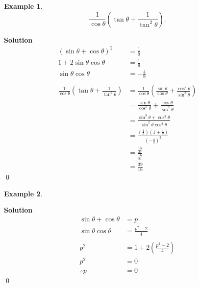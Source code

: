 \documentclass{article}
\newtheorem*{example*}{Example}
\newenvironment{solution}{\begin{trivlist}\item[]{\bf Solution}}{\qed \end{trivlist}}
\begin{document}
\newpage
\begin{example*}
    \[
    \frac{1}{\cos\theta}\left( \tan\theta + \frac{1}{\tan^2\theta} \right).
    \]
\end{example*}
\begin{solution}
    \begin{align*}
        (\sin\theta + \cos\theta)^2 &= \frac{1}{9} \\
        1 + 2\sin\theta\cos\theta &= \frac{1}{9} \\
        \sin\theta\cos\theta &= -\frac{4}{9}
        \\\\
        \frac{1}{\cos\theta}\left( \tan\theta + \frac{1}{\tan^2\theta} \right)
        &= \frac{1}{\cos\theta}\left( \frac{\sin\theta}{\cos\theta} + \frac{\cos^2\theta}{\sin^2\theta} \right) \\[0.5em]
        &= \frac{\sin\theta}{\cos^2\theta} + \frac{\cos\theta}{\sin^2\theta} \\[0.5em]
        &= \frac{\sin^3\theta + \cos^3\theta}{\sin^2\theta\cos^2\theta} \\[0.5em]
        &= \frac{\left( \frac{1}{3} \right)\left( 1 + \frac{4}{9} \right)}{\left( -\frac{4}{9} \right)^2} \\[0.5em]
        &= \frac{\frac{13}{27}}{\frac{16}{81}} \\[0.5em]
        &= \boxed{\frac{39}{16}}
    \end{align*}
\end{solution}

\begin{example*}
\end{example*}
\begin{solution}
    \begin{align*}
        \sin\theta + \cos\theta &= p \\
        \sin\theta\cos\theta &= \frac{p^2 - 2}{4}
        \\\\
        p^2 &= 1 + 2\left( \frac{p^2 - 2}{4} \right) \\
        p^2 &= 0 \\
        \therefore p &= \boxed{0}
    \end{align*}
\end{solution}
\end{document}
